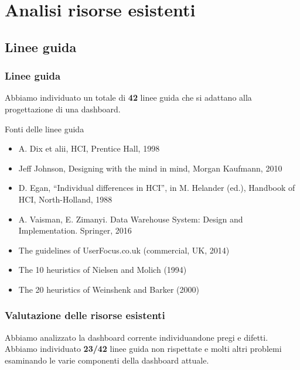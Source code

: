 \documentclass[handout]{beamer}
\begin{document}
	\section{Analisi risorse esistenti}
		\subsection{Linee guida}

			\begin{frame}
	 			\frametitle{Linee guida}
				Abbiamo individuato un totale di \textbf{42} linee guida che si adattano alla progettazione di una dashboard.
				\begin{block}{Fonti delle linee guida}
					\begin{itemize}[<+->]
						\item A. Dix et alii, HCI, Prentice Hall, 1998\\
						\item Jeff Johnson, Designing with the mind in mind, Morgan Kaufmann, 2010\\
						\item D. Egan, “Individual differences in HCI”, in M. Helander (ed.), Handbook of HCI, North-Holland, 1988\\
						\item A. Vaisman, E. Zimanyi. Data Warehouse System: Design and Implementation. Springer, 2016\\
						\item The guidelines of UserFocus.co.uk (commercial, UK, 2014)\\
						\item The 10 heuristics of Nielsen and Molich (1994)\\
						\item The 20 heuristics of Weinshenk and Barker (2000)\\
					\end{itemize}
				\end{block}
			\end{frame}
		
			\begin{frame}
				\frametitle{Valutazione delle risorse esistenti}
				Abbiamo analizzato la dashboard corrente individuandone pregi e difetti. \newline \newline
				Abbiamo individuato \textbf{23/42} linee guida non rispettate e molti altri problemi esaminando le varie componenti della dashboard attuale. 
			\end{frame}
\end{document}
